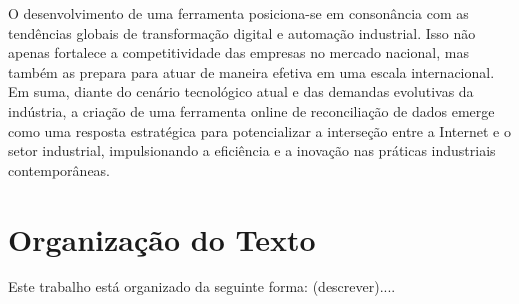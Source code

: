 O desenvolvimento de uma ferramenta posiciona-se em consonância com as tendências globais de transformação digital e automação industrial. Isso não apenas fortalece a competitividade das empresas no mercado nacional, mas também as prepara para atuar de maneira efetiva em uma escala internacional. Em suma, diante do cenário tecnológico atual e das demandas evolutivas da indústria, a criação de uma ferramenta online de reconciliação de dados emerge como uma resposta estratégica para potencializar a interseção entre a Internet e o setor industrial, impulsionando a eficiência e a inovação nas práticas industriais contemporâneas.

\section{Organização do Texto}

Este trabalho está organizado da seguinte forma: (descrever)....


